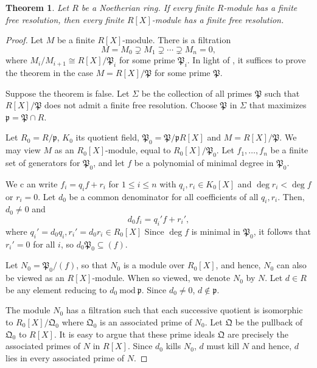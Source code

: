 \documentclass[12pt]{article}
\theoremstyle{thmstyle}
\newtheorem{theorem}{Theorem}[section]
\theoremstyle{defstyle}
\newcommand{\frakp}{\mathfrak{p}} %
\newcommand{\frakP}{\mathfrak{P}} %
\newcommand{\frakQ}{\mathfrak{Q}} %
\renewcommand{\mod}{~\mathrm{mod}~}
\renewcommand{\le}{\leqslant}
\begin{document}
\begin{theorem}
    Let $R$ be a Noetherian ring. If every finite $R$-module has a finite free resolution, then every finite $R[X]$-module has a finite free resolution.
\end{theorem}
\begin{proof}
    Let $M$ be a finite $R[X]$-module. There is a filtration 
    \begin{equation*}
        M = M_0\supsetneq M_1\supsetneq\cdots\supsetneq M_n = 0,
    \end{equation*}
    where $M_i/M_{i + 1}\cong R[X]/\frakP_i$ for some prime $\frakP_i$. In light of , it suffices to prove the theorem in the case $M = R[X]/\frakP$ for some prime $\frakP$.

    Suppose the theorem is false. Let $\Sigma$ be the collection of all primes $\frakP$ such that $R[X]/\frakP$ does not admit a finite free resolution. Choose $\frakP$ in $\Sigma$ that maximizes $\frakp = \frakP\cap R$.

    Let $R_0 = R/\frakp$, $K_0$ its quotient field, $\frakP_0 = \frakP/\frakp R[X]$ and $M = R[X]/\frakP$. We may view $M$ as an $R_0[X]$-module, equal to $R_0[X]/\frakP_0$. Let $f_1,\dots,f_n$ be a finite set of generators for $\frakP_0$, and let $f$ be a polynomial of minimal degree in $\frakP_0$. 

    We c an write $f_i = q_if + r_i$ for $1\le i\le n$ with $q_i, r_i\in K_0[X]$ and $\deg r_i < \deg f$ or $r_i = 0$. Let $d_0$ be a common denominator for all coefficients of all $q_i, r_i$. Then, $d_0\ne 0$ and 
    \begin{equation*}
        d_0f_i = q_i'f + r_i',
    \end{equation*}
    where $q_i' = d_0q_i, r_i' = d_0r_i\in R_0[X]$ Since $\deg f$ is minimal in $\frakP_0$, it follows that $r_i' = 0$ for all $i$, so $d_0\frakP_0\subseteq(f)$.

    Let $N_0 = \frakP_0/(f)$, so that $N_0$ is a module over $R_0[X]$, and hence, $N_0$ can also be viewed as an $R[X]$-module. When so viewed, we denote $N_0$ by $N$. Let $d\in R$ be any element reducing to $d_0\mod\frakp$. Since $d_0\ne 0$, $d\notin\frakp$.

    The module $N_0$ has a filtration such that each successive quotient is isomorphic to $R_0[X]/\frakQ_0$ where $\frakQ_0$ is an associated prime of $N_0$. Let $\frakQ$ be the pullback of $\frakQ_0$ to $R[X]$. It is easy to argue that these prime ideals $\frakQ$ are precisely the associated primes of $N$ in $R[X]$. Since $d_0$ kills $N_0$, $d$ must kill $N$ and hence, $d$ lies in every associated prime of $N$. 
    

\end{proof}
\end{document}

